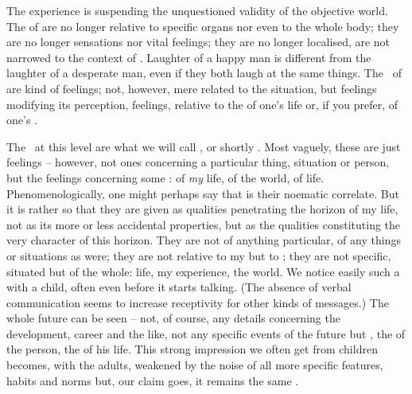 The experience  is  suspending the unquestioned
validity of the objective world.  The  of  are no longer
relative to specific organs nor even to the whole body; they are no longer
sensations nor vital feelings; they are no longer localised, are not narrowed to
the context of . Laughter of a happy man is different from the
laughter of a desperate man, even if they both laugh at the same things.  The
\oss\ of  are kind of feelings; not, however, mere 
related to the  situation, but feelings modifying its perception,
 feelings, relative to the  of one's life or, if you
prefer, of one's .


The \oss\ at this level are what we will call , or
shortly .  Most vaguely, these are just feelings -- however,
not ones concerning a particular thing, situation or person, but the feelings
concerning some : of {\em my} life, of the world, of life.
Phenomenologically, one might perhaps say that  is their noematic
correlate. But it is rather so that they are given as qualities penetrating the
horizon of my life, not as its more or less accidental properties, but as the
qualities constituting the very character of this horizon.  They are not
 of anything particular, of any things or situations as
 were; they are not relative to my  but to ;
they are not specific, situated  but  of the whole:
life, my experience, the world. We notice easily such a  with a
child, often even before it starts talking. (The absence of verbal communication
seems to increase receptivity for other kinds of messages.) The whole future can
be seen -- not, of course, any details concerning the development, career and
the like, not any specific events of the future but , the
 of the person, 
the  of his life.  This strong
impression we often get from children becomes, with the adults, weakened by the
noise of all more specific features, habits and norms but, our claim goes, it
remains the same .

